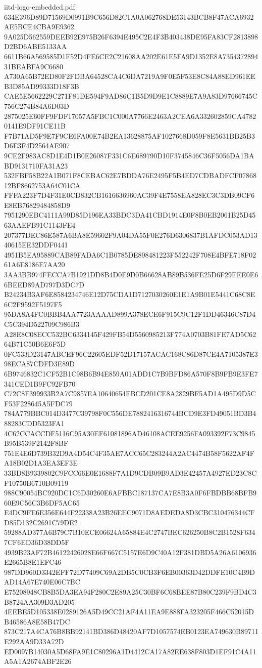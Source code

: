 \begin{filecontents*}[overwrite]{iitd-logo-embedded.pdf}
634E396D89D71569D0991B9C656D82C1A0A062768DE53143BCB8F47ACA6932AE5BCE4CBA9E9362
9A025D562559DEEB92E975B26F6394E495C2E4F3B403438DE95FA83CF2813898D2BD6ABE5133AA
6611B66A569585D1F52D4FE6CE2C21608AA202E61E5FA9D1352E8A735437289431BEABFA9C6680
A730A65B72ED80F2FDBA64528CA4C6DA7219A9F0E5F53E8C84A88ED961EEB3D85AD99333D18F3B
CAE5E5662229C271F81DE594F9AD86C1B5D9D9E1C8889E7A9A83D97666745C756C274B84A6D03D
2875025E60FF9FDF17057A5FBC1C000A7766E2463A2CEA6A332602859CA47820141E9DF91CE11B
F7B71AD5F9E7F9CE6FA00E74B2EA13628875AF1027668D059F8E5631BB25B3D6E3F4D2564AE907
9CE2F983AC8D1E4D1B0E26087F331C6E689790D10F3745846C36F5056DA1BABD9131710FA31A23
532FBF58B22A1B071F8CEBAC62E7BDDA76E2495F5B4ED7CDBADFCF0786812BF8662753A64C01CA
FFFA223F7D4F31E0CD832CB1616636960AC39F4E7558EA828EC3C3DB09CF6E8EB76829484858D9
7951290EBC4111A99D85D196EA33BDC3DA41CBD1914E0F8B0EB2061B25D4563AAEFB91C1143FE4
207377DEC86E587A6BA8E59602F9A04DA55F0E276D6306837B1AFDC053AD1340615EE32DDF0441
4951B5EA95889CAB89FADA6C1B0785DE898481223F552242F708E4BFE718F0261A6E8186E7AA20
3AA3BB974FECCA7B1921DD8B4D0E9D0B66628AB89B536FE25D6F29EEE0E66BEED89AD797D3DC7D
B24234B3AF6E8584234746E12D75CDA1D7127030260E1E1A9B01E5441C68C8E6C2F9592F5197F5
95DA8A4FC0BBB4AA7723AAAAD899A378ECE6F915C9C12F1DD46346C87D4C5C394D522709C986B3
A28E8C08ECC532BC6334145F429FB54D5560985213F774A0703B81FE7AD5C6264B71C50B6E6F5D
0FC533D23147ABCEF96C22605EDF52D17157ACAC168C86D87CE4A7105387E398ECA87CDFD3E89D
6B9746832C1CF52B1C98B6B94E859A01ADD1C7B9BFD86A570F8B9FB9E3FE7341CED1B9FC92FB70
C72C8F399933B2A7C9857EA10640654EBCD201CE8A2829BF5AD1A495D9D5CF53F228645A5FDC79
784A779BBC014D3477C39798F0C556DE7882416316744BCD9E3FD49051BD3B488283CDD5323FA1
4C62CCACCDF5116C95A30EF61081896AD46108ACEE9256FA093392F73C9845B95B539F2142F8BF
751E4E6D739B32D9A4D54C4F35AE7ACC65C283244A2AC4474B58F5622AF4FA18B02D1A3EA3EF3E
33BD8B9339802C9FCC66E0E1688F7A1D9CDB09B9AD3E42457A4927ED23C8CF10750B6710B09119
988C90054BC920DC1C6D30260E6AFBBC187137CA7E8B3A0F6FBDBB68BFB960E9C56C3B6DF5AC65
E4DC9FE6E356E644F22338A23B26EEC9071D8AEDEDA8D3CBC310476344CFD85D132C2691C79DE2
59288AD377A6B79C7B10ECE06624A65884E4C2747BEC626250B8C2B1528F6347CF6ED36D38DD5F
4939B23AF72B46122426028E66F667C5157E6D9C40A12F381DBD5A26A6106936E2665B8E1EFC46
987DD960D3342EFF72D77409C69A2DB5C0CB3F6EB00363D42DDFE10C4B9DAD14A67E740E06C7BC
E75208948CB8B5DA3EA94F280C2E89A25C30BF6C68BEE87B80C239F9BD4C3B8724AA309D3AD205
4EEBE5D105338E0289126A5D49CC21AF4A11EA9E888FA323205F466C52015DB46586A8E58B47DC
873C217A4CA76B8BB92141BD386D48420AF7D1057574EB0123EA749630B89711E292AA9D33A72D
ED0097B14030A5D68FA9E1C80296A1D4412CA17A82EE638F803D1EF91C4A11A5A1A2674ABF2E26

\end{filecontents*}
